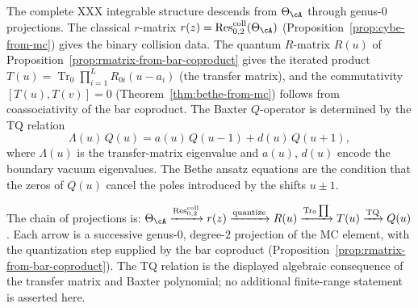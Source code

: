 \begin{remark}
\label{rem:baxter-q-from-mc}
The complete XXX integrable structure descends from
$\Theta_\cA$ through genus-$0$ projections.
The classical $r$-matrix
$r(z) = \operatorname{Res}^{\mathrm{coll}}_{0,2}(\Theta_\cA)$
(Proposition~\ref{prop:cybe-from-mc})
gives the binary collision data.
The quantum $R$-matrix $R(u)$ of
Proposition~\ref{prop:rmatrix-from-bar-coproduct}
gives the iterated product
$T(u) = \operatorname{Tr}_0 \prod_{i=1}^L R_{0i}(u - a_i)$
(the transfer matrix), and the commutativity
$[T(u), T(v)] = 0$
(Theorem~\ref{thm:bethe-from-mc})
follows from coassociativity of the bar coproduct.
The Baxter $Q$-operator is determined by the TQ relation
\[
\Lambda(u)\,Q(u) = a(u)\,Q(u - 1) + d(u)\,Q(u + 1),
\]
where $\Lambda(u)$ is the transfer-matrix eigenvalue and
$a(u)$, $d(u)$ encode the boundary vacuum eigenvalues.
The Bethe ansatz equations are the condition that the
zeros of $Q(u)$ cancel the poles introduced by
the shifts $u \pm 1$.

The chain of projections is:
$\Theta_\cA \xrightarrow{\mathrm{Res}^{\mathrm{coll}}_{0,2}} r(z)
\xrightarrow{\text{quantize}} R(u)
\xrightarrow{\mathrm{Tr}_0\prod} T(u)
\xrightarrow{\text{TQ}} Q(u)$.
Each arrow is a successive genus-$0$, degree-$2$ projection
of the MC element, with the quantization step supplied by
the bar coproduct (Proposition~\ref{prop:rmatrix-from-bar-coproduct}).
The TQ relation is the displayed algebraic consequence of the transfer
matrix and Baxter polynomial; no additional finite-range statement is
asserted here.
\end{remark}

